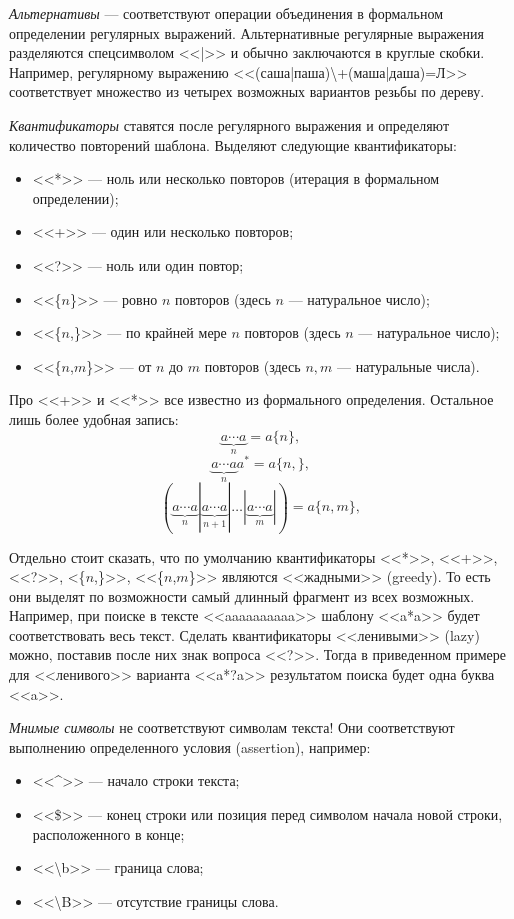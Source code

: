 \emph{Альтернативы} --- соответствуют операции объединения в формальном определении регулярных выражений. Альтернативные регулярные выражения разделяются спецсимволом <<|>> и обычно заключаются в круглые скобки. Например, регулярному выражению <<(саша|паша)\textbackslash+(маша|даша)=Л>> соответствует множество из четырех возможных вариантов резьбы по дереву.

\emph{Квантификаторы} ставятся после регулярного выражения и определяют количество повторений шаблона. Выделяют следующие квантификаторы:
\begin{itemize}
    \item <<*>> --- ноль или несколько повторов (итерация в формальном определении);
    \item <<+>> --- один или несколько повторов;
    \item <<?>> --- ноль или один повтор;
    \item <<\{$n$\}>> --- ровно $n$ повторов (здесь $n$ --- натуральное число);
    \item <<\{$n$,\}>> --- по крайней мере $n$ повторов (здесь $n$ --- натуральное число);
    \item <<\{$n$,$m$\}>> --- от $n$ до $m$ повторов (здесь $n,m$ --- натуральные числа).
\end{itemize}

Про <<+>> и <<*>> все известно из формального определения. Остальное лишь более удобная запись:
\[\underbrace{a\cdots a}_n=a\{n\},\]
\[\underbrace{a\cdots a}_na^*=a\{n,\},\]
\[
    \left(
        \underbrace{a\cdots a}_n|
        \underbrace{a\cdots a}_{n+1}|
        \ldots|
        \underbrace{a\cdots a}_{m}|        
    \right)=a\{n,m\},
\]

Отдельно стоит сказать, что по умолчанию квантификаторы <<*>>, <<+>>, <<?>>, <\{$n$,\}>>, <<\{$n$,$m$\}>> являются <<жадными>> (greedy). То есть они выделят по возможности самый длинный фрагмент из всех возможных. Например, при поиске в тексте <<aaaaaaaaaa>> шаблону <<a*a>> будет соответствовать весь текст. Сделать квантификаторы <<ленивыми>> (lazy) можно, поставив после них знак вопроса <<?>>. Тогда в приведенном примере для <<ленивого>> варианта <<a*?a>> результатом поиска будет одна буква <<a>>.

\emph{Мнимые символы} не соответствуют символам текста! Они соответствуют выполнению определенного условия (assertion), например:
\begin{itemize}
    \item <<\^{}>> --- начало строки текста;
    \item <<\$>> --- конец строки или позиция перед символом начала новой строки, расположенного в конце;
    \item <<\textbackslash b>> --- граница слова;
    \item <<\textbackslash B>> --- отсутствие границы слова.
\end{itemize}

